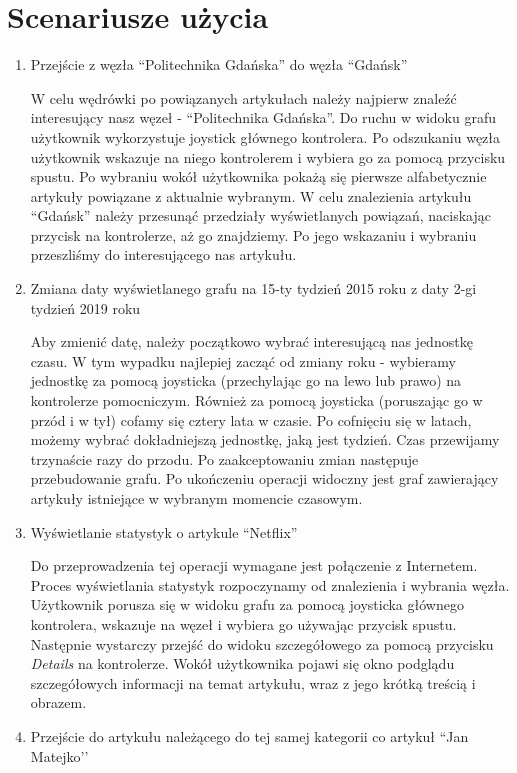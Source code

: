 \section{Scenariusze użycia}
\begin{enumerate}
\item Przejście z węzła ``Politechnika Gdańska'' do węzła ``Gdańsk''

	W celu wędrówki po powiązanych artykułach należy najpierw znaleźć interesujący nasz węzeł - ``Politechnika Gdańska''. Do ruchu w widoku grafu użytkownik wykorzystuje joystick głównego kontrolera. Po odszukaniu węzła użytkownik wskazuje na niego kontrolerem i wybiera go za pomocą przycisku spustu. Po wybraniu wokół użytkownika pokażą się pierwsze alfabetycznie artykuły powiązane z aktualnie wybranym. W celu znalezienia artykułu ``Gdańsk'' należy przesunąć przedziały wyświetlanych powiązań, naciskając przycisk na kontrolerze, aż go znajdziemy. Po jego wskazaniu i wybraniu przeszliśmy do interesującego nas artykułu.
	
\item Zmiana daty wyświetlanego grafu na 15-ty tydzień  2015 roku z daty 2-gi tydzień 2019 roku

    Aby zmienić datę, należy początkowo wybrać interesującą nas jednostkę czasu. W tym wypadku najlepiej zacząć od zmiany roku - wybieramy jednostkę za pomocą joysticka (przechylając go na lewo lub prawo) na kontrolerze pomocniczym. Również za pomocą joysticka (poruszając go w przód i w tył) cofamy się cztery lata w czasie. Po cofnięciu się w latach, możemy wybrać dokładniejszą jednostkę, jaką jest tydzień. Czas przewijamy trzynaście razy do przodu. Po zaakceptowaniu zmian następuje przebudowanie grafu. Po ukończeniu operacji widoczny jest graf zawierający artykuły istniejące w wybranym momencie czasowym.
	
\item Wyświetlanie statystyk o artykule ``Netflix''

	Do przeprowadzenia tej operacji wymagane jest połączenie z Internetem. Proces wyświetlania statystyk rozpoczynamy od znalezienia i wybrania węzła. Użytkownik porusza się w widoku grafu za pomocą joysticka głównego kontrolera, wskazuje na węzeł i wybiera go używając przycisk spustu. Następnie wystarczy przejść do widoku szczegółowego za pomocą przycisku \textit{Details} na kontrolerze. Wokół użytkownika pojawi się okno podglądu szczegółowych informacji na temat artykułu, wraz z jego krótką treścią i obrazem.
	
\item Przejście do artykułu należącego do tej samej kategorii co artykuł ``Jan Matejko’’


\end{enumerate}
